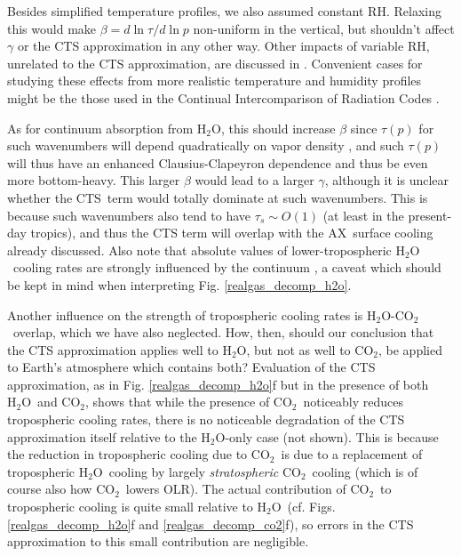\documentclass{ametsoc}
\newcommand{\cotwo}{\ensuremath{\mathrm{CO_2}}}
\newcommand{\htwo}{\ensuremath{\mathrm{H_2O}}}
\newcommand{\RH}{\ensuremath{\mathrm{RH}}}
\newcommand{\taus}{\ensuremath{\tau_s}}
\newcommand{\AX}{\ensuremath{\mathrm{AX}}}
\newcommand{\CTS}{\ensuremath{\mathrm{CTS}}}
\begin{document}
Besides simplified temperature profiles, we also assumed constant \RH.  Relaxing this would make $\beta = d \ln \tau /d \ln p$ non-uniform in the vertical, but shouldn't affect $\gamma$ or the CTS approximation in any other way. Other impacts of variable \RH, unrelated to the CTS approximation, are discussed in \cite{jeevanjee2019a}.   Convenient cases for studying these effects from more realistic temperature and humidity profiles might be the those used in the Continual Intercomparison of Radiation Codes \citep[CIRC;][]{oreopoulos2010}. 

As for continuum absorption from \htwo, this should increase $\beta$ since $\tau(p)$ for such wavenumbers will depend quadratically on vapor density \citep[because continuum pressure-broadening is largely self-broadening, e.g.][]{pierrehumbert2010}, and such $\tau(p)$  will thus have an enhanced Clausius-Clapeyron dependence and thus be even more bottom-heavy. This larger $\beta$ would lead to a larger $\gamma$, although it is unclear whether the \CTS\ term would totally dominate at such wavenumbers. This is because such wavenumbers also tend to have $\taus \sim O(1)$ (at least in the present-day tropics), and thus the CTS term will overlap with the \AX\ surface cooling already discussed. Also note that absolute values of lower-tropospheric \htwo\ cooling rates are strongly influenced by the continuum \citep{jeevanjee2019a}, a caveat which should be kept in mind when interpreting Fig. \ref{realgas_decomp_h2o}. 

Another influence on the strength of tropospheric cooling rates is \htwo-\cotwo\ overlap, which we have also neglected. How, then, should our conclusion that the CTS approximation applies well to \htwo, but not as well to \cotwo, be applied to Earth's atmosphere which contains both? Evaluation of the CTS approximation, as in Fig. \ref{realgas_decomp_h2o}f but in the presence of both \htwo\ and \cotwo, shows that while the presence of \cotwo\ noticeably reduces tropospheric cooling rates, there is no noticeable degradation of the CTS approximation itself relative to the \htwo-only case (not shown). This is because the reduction in tropospheric cooling due to \cotwo\ is due to a replacement of tropospheric \htwo\ cooling by largely \emph{stratospheric} \cotwo\ cooling (which is of course also how \cotwo\ lowers OLR). The actual contribution of \cotwo\ to tropospheric cooling is quite small relative to \htwo\ (cf. Figs. \ref{realgas_decomp_h2o}f and \ref{realgas_decomp_co2}f), so errors in the CTS approximation to this small contribution are negligible.
\end{document}
